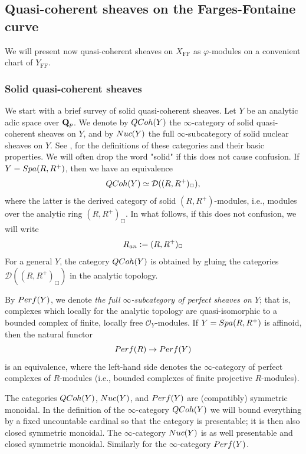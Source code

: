 \documentclass[10pt,reqno]{amsart}
\theoremstyle{definition}
\theoremstyle{remark}
\def\phi{\varphi}
\newcommand{\FF}{\operatorname{FF} }
\newcommand{\so}{{\mathcal O}}
\newcommand{\sd}{{\mathcal{D}}}
\numberwithin{equation}{section}
\def\Q{{\bf Q}} \def\Z{{\bf Z}}
\def\AN{$-_{\rm an}$}
\def\DER{$\sd(-_{\Box})$, $ \sd(\B^{\FF}_{S,\Box})$, $ \sd({\B}^{\FF}_{S})^{\phi}$}
\numberwithin{equation}{section}
\begin{document}
 \subsection{Quasi-coherent sheaves on the Farges-Fontaine curve} We will present now quasi-coherent sheaves on $X_{\FF}$ as $\phi$-modules on a convenient chart of $Y_{\FF}$. 
  \subsubsection{Solid quasi-coherent sheaves} 
We start with a brief survey of solid quasi-coherent sheaves. 
Let  $Y$ be an analytic adic space over $\Q_p$. We denote by ${\rm QCoh}(Y )$ the $\infty$-category of solid quasi-coherent sheaves
on $Y$, and by  ${\rm Nuc}(Y )$ the full $\infty$-subcategory of solid nuclear sheaves on $Y$.
  See \cite{And21}, \cite{And23} for the  definitions of these categories and their basic properties.
 We will  often drop the word "solid" if this does not cause confusion.
 If $Y={\rm Spa}(R,R^+)$, then we have an \index{DER@\DER}equivalence \cite[Th.\,1.6]{And21}
 \begin{equation}\label{eq1}
  {\rm QCoh}(Y)\simeq \sd((R,R^+)_{\Box}),
  \end{equation}
  where the latter is the derived category of solid $(R,R^+)$-modules, i.e., modules over the analytic ring $(R,R^+)_{\Box}$.  In what follows, if this does not confusion, 
  we will \index{AN@\AN}write 
$$R_{\rm an}:=(R,R^+)_{\Box}$$
 For a general $Y$, the category $ {\rm QCoh}(Y)$ is obtained by  gluing the categories $\sd((R,R^+)_{\Box})$
  in the analytic topology. 


   By ${\rm Perf}(Y )$, we denote
{\it the full $\infty$-subcategory of perfect sheaves on $Y$}; 
that is,  complexes which locally for the analytic topology are quasi-isomorphic to a bounded complex of finite, locally free $\so_Y$-modules. If $Y={\rm Spa}(R,R^+)$ is affinoid, then the natural functor 
$$
{\rm Perf}(R )\to {\rm Perf}(Y )
$$
is an equivalence, where the left-hand side denotes the $\infty$-category of perfect complexes of $R$-modules (i.e., bounded complexes of finite projective $R$-modules).

   The categories ${\rm QCoh}(Y )$, ${\rm Nuc}(Y )$, and $ {\rm Perf}(Y )$ are (compatibly) symmetric monoidal. In the definition of the $\infty$-category ${\rm QCoh}(Y )$ we will bound everything by a fixed uncountable cardinal  so that the category is presentable; it is then also
closed symmetric monoidal. The $\infty$-category ${\rm Nuc}(Y )$ is as well presentable and closed symmetric monoidal.  Similarly for the $\infty$-category
${\rm Perf}(Y )$.
\end{document}
